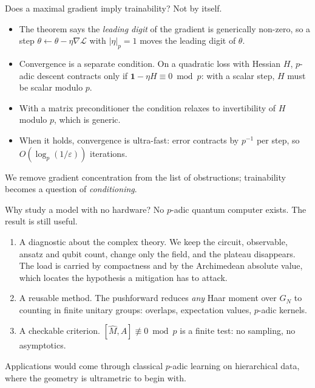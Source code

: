 \documentclass[aspectratio=169,compress]{beamer}
\newcommand{\Id}{\mathbf{1}}
\newcommand{\loss}{\mathcal{L}}
\newcommand{\padicnorm}[1]{\left|#1\right|_p}
\begin{document}
\begin{frame}{Does a maximal gradient imply trainability?}
  Not by itself.
  \begin{itemize}
    \item The theorem says the \emph{leading digit} of the gradient is
      generically non-zero, so a step $\theta\leftarrow\theta-\eta\nabla\loss$
      with $\padicnorm\eta=1$ moves the leading digit of $\theta$.
    \item Convergence is a separate condition. On a quadratic loss with Hessian
      $H$, $p$-adic descent contracts only if $\Id-\eta H\equiv0\bmod p$:
      with a scalar step, $H$ must be \alert{scalar modulo $p$}.
    \item With a matrix preconditioner the condition relaxes to
      \alert{invertibility of $H$ modulo $p$}, which is generic.
    \item When it holds, convergence is ultra-fast: error contracts by $p^{-1}$
      per step, so $O(\log_p(1/\varepsilon))$ iterations.
  \end{itemize}
  \vspace{0.3em}
  We remove gradient concentration from the list of obstructions; trainability
  becomes a question of \emph{conditioning}.
\end{frame}

\begin{frame}{Why study a model with no hardware?}
  No $p$-adic quantum computer exists. The result is still useful.
  \begin{enumerate}
    \item \alert{A diagnostic about the complex theory.} We keep the circuit,
      observable, ansatz and qubit count, change only the field, and the
      plateau disappears. The load is carried by compactness and by the
      Archimedean absolute value, which locates the hypothesis a mitigation has
      to attack.
    \item \alert{A reusable method.} The pushforward reduces \emph{any} Haar
      moment over $G_N$ to counting in finite unitary groups: overlaps,
      expectation values, $p$-adic kernels.
    \item \alert{A checkable criterion.} $[\widehat M,A]\not\equiv0\bmod p$ is
      a finite test: no sampling, no asymptotics.
  \end{enumerate}
  Applications would come through classical $p$-adic learning on hierarchical
  data, where the geometry is ultrametric to begin with.
\end{frame}
\end{document}
